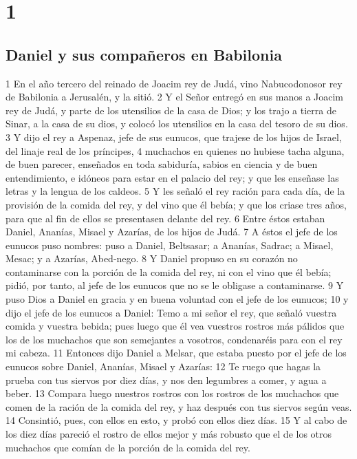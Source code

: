 
\chapter{1}

\section*{Daniel y sus compañeros en Babilonia}

1 En el año tercero del reinado de Joacim rey de Judá, vino Nabucodonosor rey de Babilonia a Jerusalén, y la sitió. 
2 Y el Señor entregó en sus manos a Joacim rey de Judá, y parte de los utensilios de la casa de Dios; y los trajo a tierra de Sinar, a la casa de su dios, y colocó los utensilios en la casa del tesoro de su dios.
3 Y dijo el rey a Aspenaz, jefe de sus eunucos, que trajese de los hijos de Israel, del linaje real de los príncipes,
4 muchachos en quienes no hubiese tacha alguna, de buen parecer, enseñados en toda sabiduría, sabios en ciencia y de buen entendimiento, e idóneos para estar en el palacio del rey; y que les enseñase las letras y la lengua de los caldeos. 
5 Y les señaló el rey ración para cada día, de la provisión de la comida del rey, y del vino que él bebía; y que los criase tres años, para que al fin de ellos se presentasen delante del rey.
6 Entre éstos estaban Daniel, Ananías, Misael y Azarías, de los hijos de Judá.
7 A éstos el jefe de los eunucos puso nombres: puso a Daniel, Beltsasar; a Ananías, Sadrac; a Misael, Mesac; y a Azarías, Abed-nego.
8 Y Daniel propuso en su corazón no contaminarse con la porción de la comida del rey, ni con el vino que él bebía; pidió, por tanto, al jefe de los eunucos que no se le obligase a contaminarse.
9 Y puso Dios a Daniel en gracia y en buena voluntad con el jefe de los eunucos;
10 y dijo el jefe de los eunucos a Daniel: Temo a mi señor el rey, que señaló vuestra comida y vuestra bebida; pues luego que él vea vuestros rostros más pálidos que los de los muchachos que son semejantes a vosotros, condenaréis para con el rey mi cabeza.
11 Entonces dijo Daniel a Melsar, que estaba puesto por el jefe de los eunucos sobre Daniel, Ananías, Misael y Azarías:
12 Te ruego que hagas la prueba con tus siervos por diez días, y nos den legumbres a comer, y agua a beber.
13 Compara luego nuestros rostros con los rostros de los muchachos que comen de la ración de la comida del rey, y haz después con tus siervos según veas.
14 Consintió, pues, con ellos en esto, y probó con ellos diez días.
15 Y al cabo de los diez días pareció el rostro de ellos mejor y más robusto que el de los otros muchachos que comían de la porción de la comida del rey.
